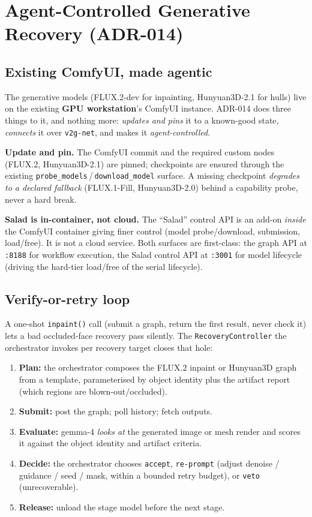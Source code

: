 \documentclass[a4paper,11pt]{report}
\newcommand{\code}[1]{\texttt{#1}}
\begin{document}
\chapter{Agent-Controlled Generative Recovery (ADR-014)}

\section{Existing ComfyUI, made agentic}
The generative models (FLUX.2-dev for inpainting, Hunyuan3D-2.1 for hulls) live on the existing
\textbf{GPU workstation}'s ComfyUI instance. ADR-014 does three things to it, and nothing more:
\emph{updates and pins} it to a known-good state, \emph{connects} it over \code{v2g-net}, and makes it
\emph{agent-controlled}.

\textbf{Update and pin.} The ComfyUI commit and the required custom nodes (FLUX.2, Hunyuan3D-2.1) are
pinned; checkpoints are ensured through the existing \code{probe\_models}\,/\allowbreak\,\code{download\_model}
surface. A missing checkpoint \emph{degrades to a declared fallback} (FLUX.1-Fill, Hunyuan3D-2.0)
behind a capability probe, never a hard break.

\textbf{Salad is in-container, not cloud.} The ``Salad'' control API is an add-on \emph{inside} the
ComfyUI container giving finer control (model probe/download, submission, load/free). It is not a cloud
service. Both surfaces are first-class: the graph API at \code{:8188} for workflow execution, the Salad
control API at \code{:3001} for model lifecycle (driving the hard-tier load/free of the serial
lifecycle).

\section{Verify-or-retry loop}
A one-shot \code{inpaint()} call (submit a graph, return the first result, never check it) lets a bad
occluded-face recovery pass silently. The \code{RecoveryController} the orchestrator invokes per
recovery target closes that hole:

\begin{enumerate}
  \item \textbf{Plan:} the orchestrator composes the FLUX.2 inpaint or Hunyuan3D graph from a template,
  parameterised by object identity plus the artifact report (which regions are blown-out/occluded).
  \item \textbf{Submit:} post the graph; poll history; fetch outputs.
  \item \textbf{Evaluate:} gemma-4 \emph{looks at} the generated image or mesh render and scores it
  against the object identity and artifact criteria.
  \item \textbf{Decide:} the orchestrator chooses \code{accept}, \code{re-prompt} (adjust denoise /
  guidance / seed / mask, within a bounded retry budget), or \code{veto} (unrecoverable).
  \item \textbf{Release:} unload the stage model before the next stage.
\end{enumerate}
\end{document}
